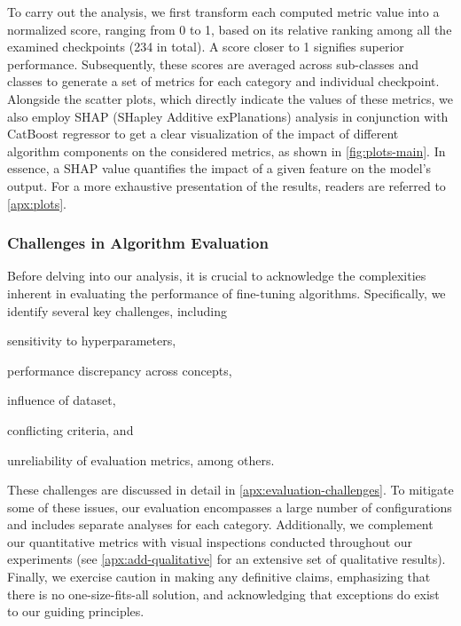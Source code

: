 To carry out the analysis, we first transform each computed metric value into a normalized score, ranging from 0 to 1, based on its relative ranking among all the examined checkpoints (234 in total). A score closer to 1 signifies superior performance. Subsequently, these scores are averaged across sub-classes and classes to generate a set of metrics for each category and individual checkpoint. Alongside the scatter plots, which directly indicate the values of these metrics, we also employ SHAP (SHapley Additive exPlanations) analysis \citep{NIPS2017_8a20a862} in conjunction with CatBoost regressor \citep{prokhorenkova2018catboost} to get a clear visualization of the impact of different algorithm components on the considered metrics, as shown in \cref{fig:plots-main}.
In essence, a SHAP value quantifies the impact of a given feature on the model's output.
For a more exhaustive presentation of the results, readers are referred to \cref{apx:plots}.


\subsubsection{Challenges in Algorithm Evaluation}

Before delving into our analysis, it is crucial to acknowledge the complexities inherent in evaluating the performance of fine-tuning algorithms. Specifically, we identify several key challenges, including
\begin{enumerate*}
    \item sensitivity to hyperparameters,
    \item performance discrepancy across concepts,
    \item influence of dataset,
    \item conflicting criteria, and
    \item unreliability of evaluation metrics, among others.
\end{enumerate*}
These challenges are discussed in detail in \cref{apx:evaluation-challenges}.
To mitigate some of these issues, our evaluation encompasses a large number of configurations and includes separate analyses for each category. Additionally, we complement our quantitative metrics with visual inspections conducted throughout our experiments (see \cref{apx:add-qualitative} for an extensive set of qualitative results). Finally, we exercise caution in making any definitive claims, emphasizing that there is no one-size-fits-all solution, and acknowledging that exceptions do exist to our guiding principles.




